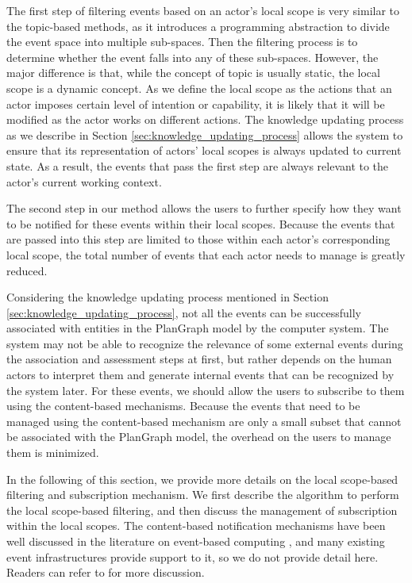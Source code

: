 The first step of filtering events based on an actor's local scope is very similar to the topic-based methods, as it introduces a programming abstraction to divide the event space into multiple sub-spaces. Then the filtering process is to determine whether the event falls into any of these sub-spaces. However, the major difference is that, while the concept of topic is usually static, the local scope is a dynamic concept. As we define the local scope as the actions that an actor imposes certain level of intention or capability, it is likely that it will be modified as the actor works on different actions. The knowledge updating process as we describe in Section \ref{sec:knowledge_updating_process} allows the system to ensure that its representation of actors' local scopes is always updated to current state. As a result, the events that pass the first step are always relevant to the actor's current working context. 

The second step in our method allows the users to further specify how they want to be notified for these events within their local scopes. Because the events that are passed into this step are limited to those within each actor's corresponding local scope, the total number of events that each actor needs to manage is greatly reduced.

Considering the knowledge updating process mentioned in Section \ref{sec:knowledge_updating_process}, not all the events can be successfully associated with entities in the PlanGraph model by the computer system. The system may not be able to recognize the relevance of some external events during the association and assessment steps at first, but rather depends on the human actors to interpret them and generate internal events that can be recognized by the system later. For these events, we should allow the users to subscribe to them using the content-based mechanisms. Because the events that need to be managed using the content-based mechanism are only a small subset that cannot be associated with the PlanGraph model, the overhead on the users to manage them is minimized.  

In the following of this section, we provide more details on the local scope-based filtering and subscription mechanism. We first describe the algorithm to perform the local scope-based filtering, and then discuss the management of subscription within the local scopes. The content-based notification mechanisms have been well discussed in the literature on event-based computing \cite{eugster2003many}, and many existing event infrastructures provide support to it, so we do not provide detail here. Readers can refer to \cite{Mhl2010} for more discussion.

